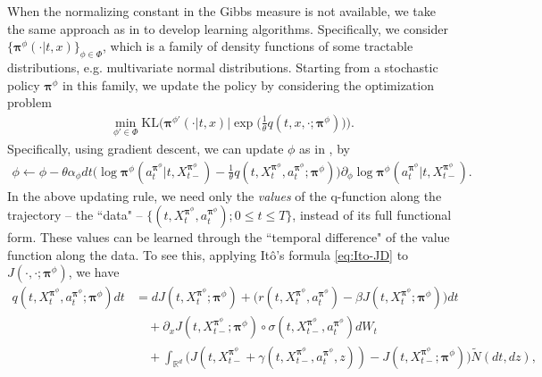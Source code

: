 \documentclass[11pt]{article}
\newcommand{\1}{\mathbbm{1}}
\begin{document}
When the normalizing constant in the Gibbs measure is not available, we take the same approach as in \cite{jia2022q} to develop learning algorithms. Specifically, we consider $\{\boldsymbol{\pi}^{\phi}(\cdot|t,x)\}_{\phi \in \Phi}$, which is a family of density functions of some tractable distributions, e.g. multivariate normal distributions. Starting from a stochastic policy $\boldsymbol{\pi}^{\phi}$ in this family, we update the policy by considering the optimization problem
\begin{align*}
\min_{\phi' \in \Phi} \text{KL} \bigg( \boldsymbol{\pi}^{\phi'}(\cdot|t,x)  \Big| \exp \Big(\frac{1}{\theta} q(t,x, \cdot; \boldsymbol{\pi}^{\phi}) \Big) \bigg).
\end{align*}
Specifically, using gradient descent, we can update $\phi$ as in  \cite{jia2022q}, by
\begin{align}\label{eq:update-un}
\phi \leftarrow \phi - \theta \alpha_{\phi} dt \Big(\log \boldsymbol{\pi}^{\phi}( a_t^{ \boldsymbol{\pi}^{\phi} }|t, X_{t-}^{ \boldsymbol{\pi}^{\phi} } ) -   \frac{1}{\theta}  q(t,X_t^{ \boldsymbol{\pi}^{\phi} }, a_t^{ \boldsymbol{\pi}^{\phi} }; \boldsymbol{\pi}^{\phi}) \Big) \partial_\phi\log \boldsymbol{\pi}^{\phi}( a_t^{ \boldsymbol{\pi}^{\phi} }|t, X_{t-}^{ \boldsymbol{\pi}^{\phi} }).
\end{align}
In the above updating rule, we need only the {\it values} of the q-function along the trajectory -- the ``data" -- $\{(t,X_t^{ \boldsymbol{\pi}^{\phi} }, a_t^{ \boldsymbol{\pi}^{\phi} }); 0 \le t \le T\}$, instead of its full functional form. These values  can be learned through the ``temporal difference" of the value function along the data. To see this, applying It\^{o}'s formula \eqref{eq:Ito-JD} to $J(\cdot, \cdot; \boldsymbol{\pi}^{\phi} )$, we have
\begin{align}
q(t, X_t^{ \boldsymbol{\pi}^{\phi} }, a_t^{ \boldsymbol{\pi}^{\phi} }; \boldsymbol{\pi}^{\phi}) dt & = dJ(t, X_t^{ \boldsymbol{\pi}^{\phi} }; \boldsymbol{\pi}^{\phi}) + \big(r(t, X_t^{ \boldsymbol{\pi}^{\phi} }, a_t^{ \boldsymbol{\pi}^{\phi} }) -\beta  J(t, X_t^{ \boldsymbol{\pi}^{\phi} }; \boldsymbol{\pi}^{\phi}) \big)dt  \\
	& \quad +     \partial_xJ(t, X_{t-}^{ \boldsymbol{\pi}^{\phi} }; \boldsymbol{\pi}^{\phi})\circ{\sigma} (t, X_{t-}^{ \boldsymbol{\pi}^{\phi} }, a_t^{ \boldsymbol{\pi}^{\phi} })dW_t \nonumber  \\
	& \quad +   \int_{\mathbb{R}^d} \big( J(t,   X^{\boldsymbol{\pi}^{\phi}}_{t-} + {\gamma}( t,X^{\boldsymbol{\pi}^{\phi}}_{t-} , a_t^{\boldsymbol{\pi}^{\phi}},z)) -  J(t,X^{\boldsymbol{\pi}^{\phi} }_{t-}; \boldsymbol{\pi}^{\phi}) \big)  \widetilde{ N}(dt, dz) ,
\end{align}
\end{document}
